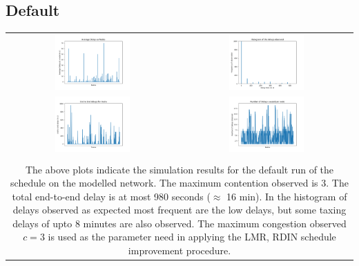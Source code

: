 \documentclass[twoside,11pt]{article}
\begin{document}
\subsection{Default}

\begin{tabular}[htp]{cc}
\includegraphics[width=0.45\textwidth]{img/Default/figure_1.png} 
&
\includegraphics[width=0.45\textwidth]{img/Default/figure_1-1.png} \\

\includegraphics[width=0.45\textwidth]{img/Default/figure_1-2.png} 
&
\includegraphics[width=0.45\textwidth]{img/Default/figure_1-3.png}  \\
\\
\multicolumn{2}{p{\textwidth}}{
The above plots indicate the simulation results for the default run of the schedule on the modelled network. The maximum contention observed is 3. The total end-to-end delay is at most 980 seconds ($\approx$ 16 min). In the histogram of delays observed as expected most frequent are the low delays, but some taxing delays of upto 8 minutes are also observed. \newline \newline
The maximum congestion observed $c = 3$ is used as the parameter need in applying the LMR, RDIN schedule improvement procedure.  \vspace{2.5in}}
\end{tabular}
\end{document}
